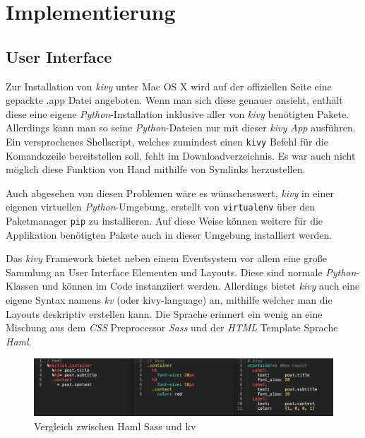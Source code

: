 \section{Implementierung}
    \subsection{User Interface}
    
    	Zur Installation von \emph{kivy} unter Mac OS X wird auf der offiziellen Seite eine gepackte .app Datei angeboten. Wenn man sich diese genauer ansieht, enthält diese eine eigene \emph{Python}-Installation inklusive aller von \emph{kivy} benötigten Pakete. Allerdings kann man so seine \emph{Python}-Dateien nur mit dieser \emph{kivy App} ausführen. Ein versprochenes Shellscript, welches zumindest einen \texttt{kivy} Befehl für die Komandozeile bereitstellen soll, fehlt im Downloadverzeichnis. Es war auch nicht möglich diese Funktion von Hand mithilfe von Symlinks herzustellen.
        
        Auch abgesehen von diesen Problemen wäre es wünschenswert, \emph{kivy} in einer eigenen virtuellen \emph{Python}-Umgebung, erstellt von \texttt{virtualenv} über den Paketmanager \texttt{pip} zu installieren. Auf diese Weise können weitere für die Applikation benötigten Pakete auch in dieser Umgebung installiert werden.
        
        Das \emph{kivy} Framework bietet neben einem Eventsystem vor allem eine große Sammlung an User Interface Elementen und Layouts. Diese sind normale \emph{Python}-Klassen und können im Code instanziiert werden. Allerdings bietet \emph{kivy} auch eine eigene Syntax namens \emph{kv} (oder kivy-language) an, mithilfe welcher man die Layouts deskriptiv erstellen kann. Die Sprache erinnert ein wenig an eine Mischung aus dem \emph{CSS} Preprocessor \emph{Sass} und der \emph{HTML} Template Sprache \emph{Haml}.      
        
        \begin{figure}[H]
    		\centering
    		\includegraphics[width=15cm]{images/hamlsasskv.png}
    		\caption{Vergleich zwischen Haml Sass und kv}
    		\label{img:HamlSassKv}
		\end{figure}
        
